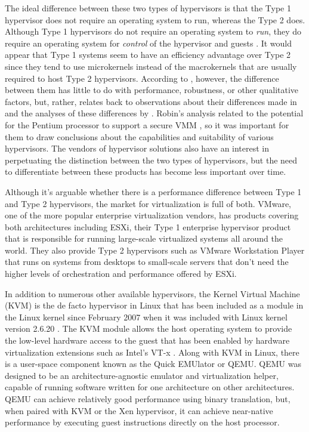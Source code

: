 The ideal difference between these two types of hypervisors is that the Type 1 hypervisor does not require an operating system to run, whereas the Type 2 does.
Although Type 1 hypervisors do not require an operating system to \emph{run}, they do require an operating system for \emph{control} of the hypervisor and guests \autocite{_liguori_1}.
It would appear that Type 1 systems seem to have an efficiency advantage over Type 2 since they tend to use microkernels instead of the macrokernels that are usually required to host Type 2 hypervisors.
According to \autocite{_liguori_1}, however, the difference between them has little to do with performance, robustness, or other qualitative factors, but, rather, relates back to  observations about their differences made in \autocite{_popek_1} and the analyses of these differences by \autocite{_robin_1}.
Robin's analysis related to the potential for the Pentium processor to support a secure VMM \autocite{_robin_1}, so it was important for them to draw conclusions about the capabilities and suitability of various hypervisors.
The vendors of hypervisor solutions also have an interest in perpetuating the distinction between the two types of hypervisors, but the need to differentiate between these products has become less important over time.  

Although it's arguable whether there is a performance difference between Type 1 and Type 2 hypervisors, the market for virtualization is full of both.
VMware, one of the more popular enterprise virtualization vendors, has products covering both architectures including ESXi, their Type 1 enterprise hypervisor product that is responsible for running large-scale virtualized systems all around the world\autocite{vmwareProducts}.
They also provide Type 2 hypervisors such as VMware Workstation Player that runs on systems from desktops to small-scale servers that don't need the higher levels of orchestration and performance offered by ESXi.

In addition to numerous other available hypervisors, the Kernel Virtual Machine (KVM) is the de facto hypervisor in Linux that has been included as a module in the Linux kernel since February 2007 when it was included with Linux kernel version 2.6.20 \autocite{_kvm_1}.
The KVM module allows the host operating system to provide the low-level hardware access to the guest that has been enabled by hardware virtualization extensions such as Intel's VT-x \autocite{_grinberg_1}.
Along with KVM in Linux, there is a user-space component known as the Quick EMUlator or QEMU\autocite{_qemu_1}.
QEMU was designed to be an architecture-agnostic emulator and virtualization helper, capable of running software written for one architecture on other architectures.
QEMU can achieve relatively good performance using binary translation, but, when paired with KVM or the Xen hypervisor, it can achieve near-native performance by executing guest instructions directly on the host processor.

